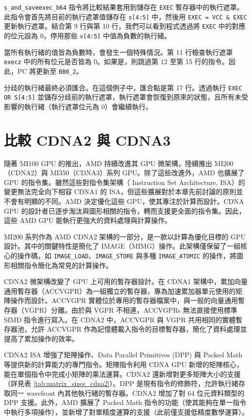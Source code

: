 \lstinline|s_and_saveexec_b64| 指令將比較結果套用到儲存在 \lstinline|EXEC| 暫存器中的執行遮罩。此指令會首先將目前的執行遮罩值儲存在 \lstinline|s[4:5]| 中，然後用 \lstinline|EXEC = VCC & EXEC| 更新執行遮罩。結合第 9 行與第 10 行，我們可以看到程式透過將 \lstinline|EXEC| 中的對應的位元設為 0，停用那些 \lstinline|v[4:5]| 中值為負數的執行緒。

當所有執行緒的值皆為負數時，會發生一個特殊情況。第 11 行檢查執行遮罩 \lstinline|execz| 中的所有位元是否皆為 0。如果是，則跳過第 12 至第 15 行的指令。因此，PC 將更新至 \lstinline|BB0_2|。

分歧的執行緒最終必須匯合。在這個例子中，匯合點是第 17 行。透過執行 \lstinline|EXEC OR S[4:5]| 並儲存分歧前的執行遮罩，執行遮罩會恢復到原來的狀態，且所有未受影響的執行緒（執行遮罩位元為 0）會繼續執行。


\section{比較 CDNA2 與 CDNA3}

隨著 MI100 GPU 的推出，AMD 持續改進其 GPU 微架構，陸續推出 MI200（CDNA2）與 MI350（CDNA3）系列 GPU。除了這些改進外，AMD 也擴展了 GPU 的指令集。雖然這些對指令集架構（ Instruction Set Architecture, ISA）的變更無法完全向下相容 CDNA1 的 ISA，但這些擴展對於本章先前討論的原則並不會有明顯的不同。AMD 決定優化這些 GPU，使其專注於計算而設計。CDNA GPU 的設計者已逐步淘汰與圖形相關的指令，轉而支援更全面的指令集。因此，這些 AMD GPU 能執行更強大的資料處理與計算操作。

MI200 系列作為 AMD CDNA2 架構的一部分，是一款以計算為優化目標的 GPU 設計。其中的關鍵特性是簡化了 IMAGE（MIMG）操作。此架構僅保留了一組核心的操作碼，如 \lstinline|IMAGE_LOAD|、\lstinline|IMAGE_STORE| 與多種 \lstinline|IMAGE_ATOMIC| 的操作，將圖形相關指令簡化為常見的計算操作。

CDNA2 微架構改變了 GPU 上可用的暫存器設計。在 CDNA1 架構中，累加向量通用暫存器（ACCVGPR）為一組獨立的暫存器，專為加速累加器單元使用的矩陣操作而設計。ACCVGPR 實體位於專用的暫存器檔案中，與一般的向量通用暫存器（VGPR）分離。由於與 VGPR 不相連，ACCVGPRs 無法直接使用標準 SIMD 指令進行寫入。在 CDNA2 中，ACCVGPR 與 VGPR 共用相同的實體暫存器池，允許 ACCVGPR 作為記憶體載入指令的目標暫存器，簡化了資料處理並提高了累加操作的效率。

CDNA2 ISA 增強了矩陣操作、Data Parallel Primitives (DPP) 與 Packed Math 等提供新的計算能力的專門指令。矩陣指令利用 CDNA GPU 新增的矩陣核心，能在單個指令中完成小矩陣的乘法運算。CDNA2 還新增對更多矩陣大小的支援（詳見表 \ref{tab:matrix_sizes_cdna2}）。DPP 是現有指令的修飾符，允許執行緒存取同一 wavefront 內其他執行緒的暫存器。CDNA2 增加了對 64 位元資料類型的 DPP 支援。此外，AMD 擴展了 Packed Math 指令的功能（使其能夠在單一指令中執行多項操作），並新增了對單精度運算的支援（此前僅支援低精度數學運算）。


